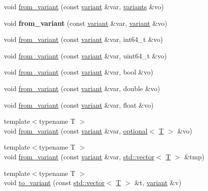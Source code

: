 \begin{DoxyCompactItemize}
\item 
void \mbox{\hyperlink{namespacefc_aadf423ceb30883b0c6ce5ae259f78022}{from\+\_\+variant}} (const \mbox{\hyperlink{classfc_1_1variant}{variant}} \&var, \mbox{\hyperlink{classstd_1_1vector}{variants}} \&vo)
\item 
\mbox{\label{namespacefc_af4ffa4ec9b1bd920e5a1875ef256b55a}} 
void {\bfseries from\+\_\+variant} (const \mbox{\hyperlink{classfc_1_1variant}{variant}} \&var, \mbox{\hyperlink{classfc_1_1variant}{variant}} \&vo)
\item 
void \mbox{\hyperlink{namespacefc_ae9e9f124635561eb45adb84cc30a9f6d}{from\+\_\+variant}} (const \mbox{\hyperlink{classfc_1_1variant}{variant}} \&var, int64\+\_\+t \&vo)
\item 
void \mbox{\hyperlink{namespacefc_afe67f9793ff8256f0e4b332c4ee1b419}{from\+\_\+variant}} (const \mbox{\hyperlink{classfc_1_1variant}{variant}} \&var, uint64\+\_\+t \&vo)
\item 
void \mbox{\hyperlink{namespacefc_a21d4ea52acb517fca8ab7b2f86bae8a7}{from\+\_\+variant}} (const \mbox{\hyperlink{classfc_1_1variant}{variant}} \&var, bool \&vo)
\item 
void \mbox{\hyperlink{namespacefc_aa583ba2127ff75e36f979b70a3aee07f}{from\+\_\+variant}} (const \mbox{\hyperlink{classfc_1_1variant}{variant}} \&var, double \&vo)
\item 
void \mbox{\hyperlink{namespacefc_ae1f4caaaa50959b0a3bc8310760c8094}{from\+\_\+variant}} (const \mbox{\hyperlink{classfc_1_1variant}{variant}} \&var, float \&vo)
\item 
{\footnotesize template$<$typename T $>$ }\\void \mbox{\hyperlink{namespacefc_afddde6a5bc786ecd2e7e4958a7bc3875}{from\+\_\+variant}} (const \mbox{\hyperlink{classfc_1_1variant}{variant}} \&var, \mbox{\hyperlink{classfc_1_1optional}{optional}}$<$ \mbox{\hyperlink{struct_t}{T}} $>$ \&vo)
\item 
{\footnotesize template$<$typename T $>$ }\\void \mbox{\hyperlink{namespacefc_a27b41c990abb0b1ea52985d4fe773ace}{from\+\_\+variant}} (const \mbox{\hyperlink{classfc_1_1variant}{variant}} \&var, \mbox{\hyperlink{classstd_1_1vector}{std\+::vector}}$<$ \mbox{\hyperlink{struct_t}{T}} $>$ \&tmp)
\item 
{\footnotesize template$<$typename T $>$ }\\void \mbox{\hyperlink{namespacefc_a54785a3ab06495c41ff38fccf39d837c}{to\+\_\+variant}} (const \mbox{\hyperlink{classstd_1_1vector}{std\+::vector}}$<$ \mbox{\hyperlink{struct_t}{T}} $>$ \&t, \mbox{\hyperlink{classfc_1_1variant}{variant}} \&v)

\end{DoxyCompactItemize}

